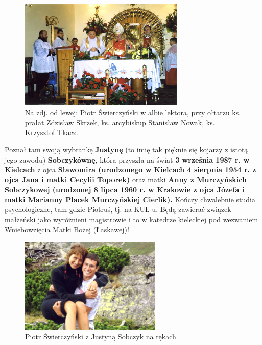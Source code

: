 \begin{figure}[!h]
\begin{center}
\includegraphics[width=0.7\textwidth]{photo/piotr_swierczynski_2.jpg}
\caption[Piotr Świerczyński w służbie ołtarza]{Na zdj. od lewej: Piotr Świerczyński w albie lektora, przy ołtarzu ks. prałat Zdzisław Skrzek, ks. arcybiskup Stanisław Nowak, ks. Krzysztof Tkacz.}
\end{center}
\end{figure}

Poznał tam swoją wybrankę \textbf{Justynę} (to imię tak pięknie się kojarzy z istotą jego zawodu) \textbf{Sobczykównę}, która przyszła na świat \textbf{3 września 1987 r. w Kielcach} z ojca \textbf{Sławomira (urodzonego w Kielcach 4 sierpnia 1954 r. z ojca Jana i matki Cecylii Toporek)} oraz matki \textbf{Anny z Murczyńskich Sobczykowej (urodzonej 8 lipca 1960 r. w Krakowie z ojca Józefa i matki Marianny Placek Murczyńskiej Cierlik).} Kończy chwalebnie studia psychologiczne, tam gdzie Piotruś, tj. na KUL-u. Będą zawierać związek małżeński jako wyróżnieni magistrowie i to w katedrze kieleckiej pod wezwaniem Wniebowzięcia Matki Bożej (Łaskawej)!
\begin{figure}[!h]
\begin{center}
\includegraphics[width=0.6\textwidth]{photo/piotr_swierczynski_justyna_sobczyk.jpg}
\caption{Piotr Świerczyński z Justyną Sobczyk na rękach}
\end{center}
\end{figure}

